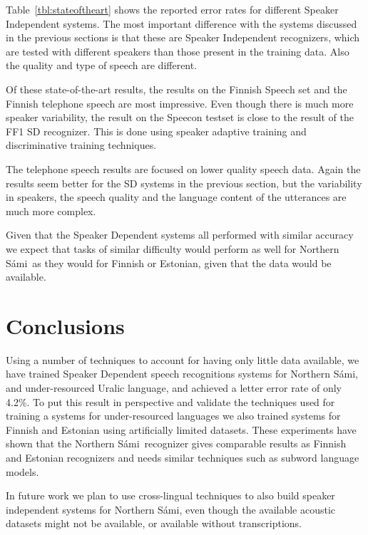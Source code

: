 \documentclass[b5paper]{article}
\newcommand{\todo}[2]{{\textcolor{red}{\bf [#1] #2 }}}
\newcommand{\ns}{Northern Sámi}
\begin{document}
Table~\ref{tbl:stateoftheart} shows the reported error rates for different Speaker Independent systems. The most important difference with the systems discussed in the previous sections is that these are Speaker Independent recognizers, which are tested with different speakers than those present in the training data. Also the quality and type of speech are different. 

Of these state-of-the-art results, the results on the Finnish Speech set and the Finnish telephone speech are most impressive. Even though there is much more speaker variability, the result on the Speecon testset is close to the result of the FF1 SD recognizer. This is done using speaker adaptive training and discriminative training techniques. 

The telephone speech results are focused on lower quality speech data. Again the results seem better for the SD systems in the previous section, but the variability in speakers, the speech quality and the language content of the utterances are much more complex. 

Given that the Speaker Dependent systems all performed with similar accuracy we expect that tasks of similar difficulty would perform as well for \ns\ as they would for Finnish or Estonian, given that the data would be available.




\section{Conclusions} 
Using a number of techniques to account for having only little data available, we have trained Speaker Dependent speech recognitions systems for \ns, and under-resourced Uralic language, and achieved a letter error rate of only 4.2\%. To put this result in perspective and validate the techniques used for training a systems for under-resourced languages we also trained systems for Finnish and Estonian using artificially limited datasets. These experiments have shown that the \ns\ recognizer gives comparable results as Finnish and Estonian recognizers and needs similar techniques such as subword language models.


In future work we plan to use cross-lingual techniques to also build speaker independent systems for \ns, even though the available acoustic datasets might not be available, or available without transcriptions.
\end{document}
